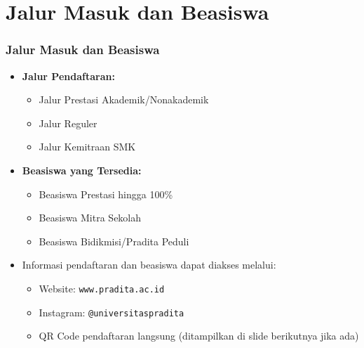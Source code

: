 \documentclass[aspectratio=169, table]{beamer}
\begin{document}
\section{Jalur Masuk dan Beasiswa}
\begin{frame}
	\frametitle{Jalur Masuk dan Beasiswa}
	\vspace{10pt}
	\begin{itemize}
		\item \textbf{Jalur Pendaftaran:}
		\begin{itemize}
			\item Jalur Prestasi Akademik/Nonakademik
			\item Jalur Reguler
			\item Jalur Kemitraan SMK
		\end{itemize}
		\item \textbf{Beasiswa yang Tersedia:}
		\begin{itemize}
			\item Beasiswa Prestasi hingga 100\%
			\item Beasiswa Mitra Sekolah
			\item Beasiswa Bidikmisi/Pradita Peduli
		\end{itemize}
		\item Informasi pendaftaran dan beasiswa dapat diakses melalui:
		\begin{itemize}
			\item Website: \texttt{www.pradita.ac.id}
			\item Instagram: \texttt{@universitaspradita}
			\item QR Code pendaftaran langsung (ditampilkan di slide berikutnya jika ada)
		\end{itemize}
	\end{itemize}
\end{frame}

\end{document}
